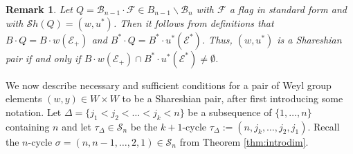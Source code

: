 \documentclass[12pt]{amsart}
\numberwithin{equation}{section}
\newtheorem{rem}[thm]{Remark}
\newcommand{\B}{\mathcal{B}}
\newcommand{\F}{\mathcal{F}}
\newcommand{\Borbitspace}{B_{n-1}\backslash\B_{n}}
\newcommand{\Sh}{\mathcal{S}h}
\begin{document}
\begin{rem}\label{r:starandtildeflags}
Let $Q=\B_{n-1}\cdot \F\in\Borbitspace$ with $\F$ a flag in standard form and with $\Sh(Q)=(w, u^{*})$.  Then it follows from definitions that $B\cdot Q=B\cdot w(\mathcal{E}_{+})$ and $B^{*}\cdot Q=B^{*}\cdot u^{*}(\mathcal{E}^{*})$. Thus, $(w,u^{*})$ is a Shareshian pair if and only if $B\cdot w(\mathcal{E}_{+})\cap B^{*}\cdot u^{*}(\mathcal{E}^{*})\neq\emptyset$.


\end{rem}

We now describe necessary and sufficient conditions for a pair of Weyl group 
elements $(w,y)\in W\times W$ to be a Shareshian pair, after first introducing some notation.  Let $\Delta=\{j_{1}<j_{2}<\dots<j_{k}<n\}$ be a subsequence of $\{1,\dots,n\}$ 
containing $n$ and let $\tau_{\Delta}\in \mathcal{S}_{n}$ be the $k+1$-cycle
$\tau_{\Delta}:=(n, j_{k}, \dots, j_{2}, j_{1})$. Recall the $n$-cycle $\sigma=(n,n-1,\dots, 2,1)\in\mathcal{S}_{n}$ from Theorem \ref{thm:introdim}.  
\end{document}
